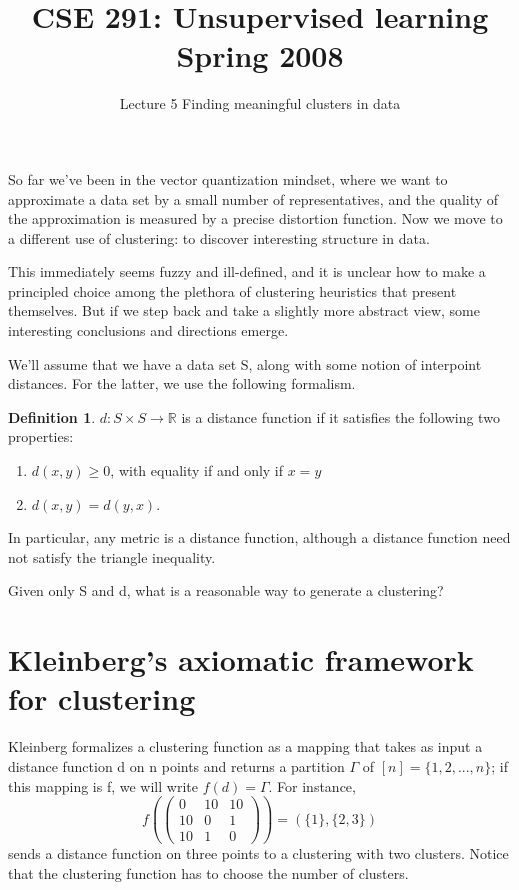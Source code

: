\documentclass[letterpaper,10pt]{article}
\theoremstyle{definition}
\newtheorem{definition}{Definition}
\theoremstyle{plain}
\begin{document}
\title{CSE 291: Unsupervised learning \\ Spring 2008}
\author{}
\date{Lecture 5 Finding meaningful clusters in data}
\maketitle

So far we've been in the vector quantization mindset, where we want to approximate a data set by a small number of representatives, and the quality of the approximation is measured by a precise distortion function. Now we move to a different use of clustering: to discover interesting structure in data.

This immediately seems fuzzy and ill-defined, and it is unclear how to make a principled choice among the plethora of clustering heuristics that present themselves. But if we step back and take a slightly more abstract view, some interesting conclusions and directions emerge.

We'll assume that we have a data set S, along with some notion of interpoint distances. For the latter, we use the following formalism.

\begin{definition}
$d:S\times S\rightarrow\mathbb{R}$ is a distance function if it satisfies the following two properties:
\begin{enumerate}
    \item $d(x,y)\ge0$, with equality if and only if $x=y$
    \item $d(x,y)=d(y,x).$
\end{enumerate}
In particular, any metric is a distance function, although a distance function need not satisfy the triangle inequality.
\end{definition}

Given only S and d, what is a reasonable way to generate a clustering?

\section{Kleinberg's axiomatic framework for clustering}
Kleinberg formalizes a clustering function as a mapping that takes as input a distance function d on n points and returns a partition $\Gamma$ of $[n]=\{1,2,...,n\}$; if this mapping is f, we will write $f(d)=\Gamma$. For instance,
\[
f\left(\begin{pmatrix}0&10&10\\ 10&0&1\\ 10&1&0\end{pmatrix}\right)=(\{1\},\{2,3\})
\]
sends a distance function on three points to a clustering with two clusters. Notice that the clustering function has to choose the number of clusters.
\end{document}
